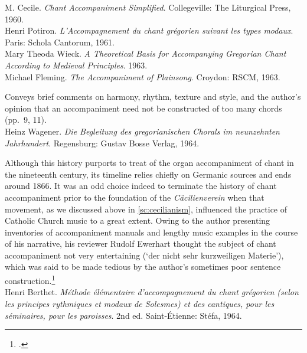     \parindent=0pt
    \hangindent=0pt
  \covid{}M. Cecile. \emph{Chant Accompaniment Simplified}. Collegeville:  The Liturgical Press, 1960. \\

    \parindent=0pt
    \hangindent=0pt
  \covid{}Henri Potiron. \emph{L'Accompagnement du chant grégorien suivant les types modaux}. Paris:  Schola Cantorum, 1961. \\

    \parindent=0pt
    \hangindent=0pt
  \covid{}Mary Theoda Wieck. \emph{A Theoretical Basis for Accompanying Gregorian Chant According to Medieval Principles}. 1963. \\

    \parindent=0pt
    \hangindent=0pt
  Michael Fleming. \emph{The Accompaniment of Plainsong}. Croydon:  RSCM, 1963.

     \parindent=20pt
     \hangindent=20pt
     Conveys brief comments on harmony, rhythm, texture and style, and the author's opinion that an accompaniment need not be constructed of too many chords (pp.~9, 11).\\

    \parindent=0pt
    \hangindent=0pt
  Heinz Wagener. \emph{Die Begleitung des gregorianischen Chorals im neunzehnten Jahrhundert}. Regensburg:  Gustav Bosse Verlag, 1964.

     \parindent=20pt
     \hangindent=20pt
     \renewcommand{\thefootnote}{$\dagger$}
Although this history purports to treat of the organ accompaniment of chant in the nineteenth century, its timeline relies chiefly on Germanic sources and ends around 1866. It was an odd choice indeed to terminate the history of chant accompaniment prior to the foundation of the \emph{Cäcilienverein} when that movement, as we discussed above in \cref{sc:cecilianism}, influenced the practice of Catholic Church music to a great extent. Owing to the author presenting inventories of accompaniment manuals and lengthy music examples in the course of his narrative, his reviewer Rudolf Ewerhart thought the subject of chant accompaniment not very entertaining (`der nicht sehr kurzweiligen Materie'), which was said to be made tedious by the author's sometimes poor sentence construction.\footnote{\cite{EwerhartReviewBegleitunggregorianischen1966}.}\\

    \parindent=0pt
    \hangindent=0pt
  \covid{}Henri Berthet. \emph{Méthode élémentaire d'accompagnement du chant grégorien (selon les principes rythmiques et modaux de Solesmes) et des cantiques, pour les séminaires, pour les paroisses}. 2nd ed. Saint-Étienne:  Stéfa, 1964. \\

